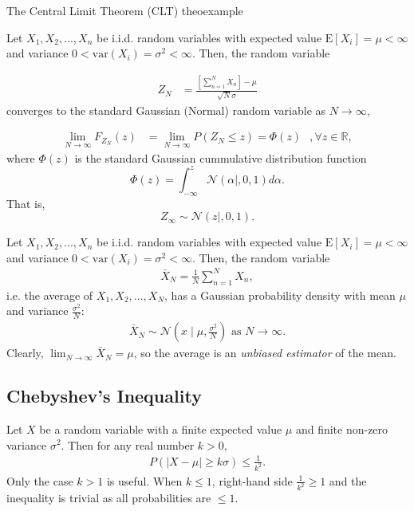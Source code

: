 \documentclass{tufte-handout}
\begin{document}
\begin{mythe}{The Central Limit Theorem (CLT) }{theoexample} 


Let $X_1, X_2,...,X_n$ be i.i.d. random variables with expected value $\mathrm E[X_i] = \mu < \infty$
 and variance $0<\mathrm{var}(X_i)=\sigma^2 < \infty$. Then, the random variable

\begin{align*}
Z_N &= \frac{\left[\sum_{n=1}^N X_n\right] - \mu}{\sqrt{N}\sigma}
\end{align*}
converges to the standard Gaussian (Normal) random variable as $N \rightarrow \infty$,


\begin{align*}
\lim_{N \rightarrow \infty} F_{Z_N}(z)  &= \lim_{N \rightarrow \infty} P(Z_N \leq z) 
= \Phi(z)\;\;\,, \forall z \in \mathbb R,
\end{align*}
where $\Phi(z)$ is the standard Gaussian cummulative distribution function 
$$\Phi(z) = \int_{-\infty}^z \mathcal N(\alpha\mid, 0,1) d\alpha.$$ That is,
$$ Z_{\infty} \sim \mathcal N(z\mid,0,1).$$

\end{mythe} 

Let $X_1, X_2,...,X_n$ be i.i.d. random variables with expected value $\mathrm E[X_i] = \mu < \infty$
 and variance $0<\mathrm{var}(X_i)=\sigma^2 < \infty$. Then, the random variable
\begin{align*}
\bar X_N = \frac{1}{N} \sum_{n=1}^N X_n, 
\end{align*} 
 i.e. the average of $X_1, X_2,..., X_N$, has a Gaussian probability density with mean $\mu$ and variance $\frac{\sigma^2}{N}$:
\begin{align*}
\bar X_N \sim \mathcal N(x\mid \mu, \frac{\sigma^2}{N}) \,\, \text{as} \,\, N\rightarrow \infty.
\end{align*}  
 Clearly,   $\lim_{N\rightarrow \infty} \bar X_N = \mu$, so the average is an \textit{unbiased estimator} of the mean.


\subsection{Chebyshev's Inequality}

Let $X$  be a random variable with a finite expected value $\mu$ and finite non-zero variance $\sigma^2$. Then for any real number $k > 0$,
\begin{align*}
P(\mid X-\mu \mid \geq k\sigma) \leq \frac{1}{k^2}.
\end{align*}
Only the case $k>1$ is useful. When $k \leq 1$, right-hand side $\frac{1}{k^2} \geq 1$ and the inequality is trivial as all probabilities are  $\leq 1$.
\end{document}
